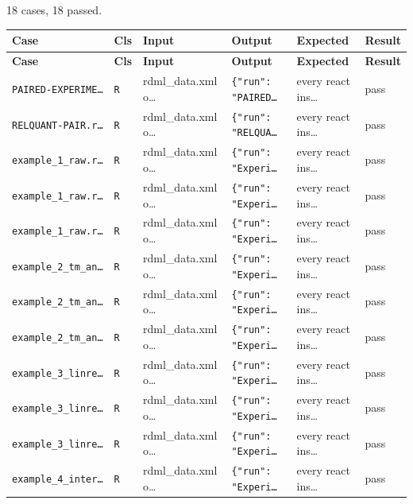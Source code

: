 \subsection*{}
{\small 18 cases, 18 passed.}\par
{\small
\begin{xltabular}{\linewidth}{|X|l|l|l|l|l|}
\toprule \textbf{Case} & \textbf{Cls} & \textbf{Input} & \textbf{Output} & \textbf{Expected} & \textbf{Result} \\\midrule\endfirsthead
\toprule \textbf{Case} & \textbf{Cls} & \textbf{Input} & \textbf{Output} & \textbf{Expected} & \textbf{Result} \\\midrule\endhead
\texttt{PAIRED-EXPERIME…} & \texttt{R} & rdml\_data.xml o… & \texttt{\{"run": "PAIRED…} & every react ins… & pass \\
\texttt{RELQUANT-PAIR.r…} & \texttt{R} & rdml\_data.xml o… & \texttt{\{"run": "RELQUA…} & every react ins… & pass \\
\texttt{example\_1\_raw.r…} & \texttt{R} & rdml\_data.xml o… & \texttt{\{"run": "Experi…} & every react ins… & pass \\
\texttt{example\_1\_raw.r…} & \texttt{R} & rdml\_data.xml o… & \texttt{\{"run": "Experi…} & every react ins… & pass \\
\texttt{example\_1\_raw.r…} & \texttt{R} & rdml\_data.xml o… & \texttt{\{"run": "Experi…} & every react ins… & pass \\
\texttt{example\_2\_tm\_an…} & \texttt{R} & rdml\_data.xml o… & \texttt{\{"run": "Experi…} & every react ins… & pass \\
\texttt{example\_2\_tm\_an…} & \texttt{R} & rdml\_data.xml o… & \texttt{\{"run": "Experi…} & every react ins… & pass \\
\texttt{example\_2\_tm\_an…} & \texttt{R} & rdml\_data.xml o… & \texttt{\{"run": "Experi…} & every react ins… & pass \\
\texttt{example\_3\_linre…} & \texttt{R} & rdml\_data.xml o… & \texttt{\{"run": "Experi…} & every react ins… & pass \\
\texttt{example\_3\_linre…} & \texttt{R} & rdml\_data.xml o… & \texttt{\{"run": "Experi…} & every react ins… & pass \\
\texttt{example\_3\_linre…} & \texttt{R} & rdml\_data.xml o… & \texttt{\{"run": "Experi…} & every react ins… & pass \\
\texttt{example\_4\_inter…} & \texttt{R} & rdml\_data.xml o… & \texttt{\{"run": "Experi…} & every react ins… & pass \\

\end{xltabular}}
